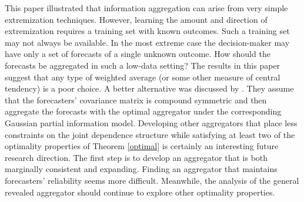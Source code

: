 \documentclass[11pt]{article}
\theoremstyle{definition}
\theoremstyle{definition}
\begin{document}
This paper illustrated that information aggregation can arise from very simple extremization techniques. However, learning the amount and direction of extremization requires a training set with known outcomes. Such a training set may not always be available. In the most extreme case  the decision-maker may have only a set of forecasts of a single unknown outcome. How should the forecasts be aggregated in such a low-data setting? The results in this paper suggest that any type of weighted average (or some other measure of central tendency) is a poor choice. A better alternative was discussed by \cite{satopaamodeling}. They assume that the forecasters' covariance matrix is compound symmetric and then aggregate the forecasts with the optimal aggregator under the corresponding Gaussian partial information model. 
 Developing other aggregators that place less constraints on the joint dependence structure while satisfying at least two of the optimality properties of Theorem \ref{optimal} is certainly an interesting future research direction. The first step is to develop an aggregator that is both marginally consistent and expanding. Finding an aggregator that maintains forecasters' reliability seems more difficult. Meanwhile, the analysis of the general revealed aggregator should continue to explore other optimality properties.



%
%
%
%
%
%
%
%
%
%
%
\end{document}
